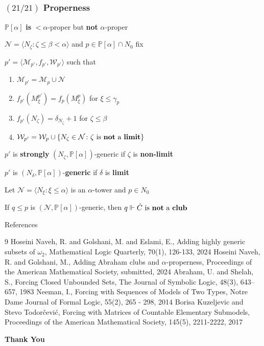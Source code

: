 \documentclass{beamer}
\newcommand{\p}{\mathds{P}}
\begin{document}
\begin{frame}
\frametitle{$(21/21)$ \hspace{20mm} Properness}
\begin{theorem}
$\p[\alpha]$ \textbf{is} $<\alpha$-proper but \textbf{not} $\alpha$-proper
\end{theorem}
\vspace{-2mm}
\pause
\begin{alertblock}{}
$\mathcal{N}=\langle N_{\zeta} \colon \zeta \leq \beta < \alpha \rangle$ and  $p \in \p[\alpha] \cap N_0$ fix

$p'= \langle \mathcal{M}_{p'}, f_{p'}, \mathcal{W}_{p'} \rangle$ such that
\begin{enumerate}
\item $\mathcal{M}_{p'}= \mathcal{M}_p \cup \mathcal{N}$
\item $f_{p'}(M^{p'}_{\xi})=f_p(M^p_{\xi})$ for $\xi \leq \gamma_p$
\item $f_{p'}(N_{\zeta})= \delta_{N_{\zeta}}+1$ for $\zeta \leq \beta$
\item $\mathcal{W}_{p'}= \mathcal{W}_p \cup \{N_{\zeta} \in \mathcal{N} \colon \zeta \text{ is \textbf{not} a \textbf{limit}} \}$
\end{enumerate}
\end{alertblock}
\vspace{-2mm}
\pause
\begin{block}{}
$p'$ is \textbf{strongly} $(N_{\zeta}, \p[\alpha])$-generic if $\zeta$ is \textbf{non-limit}

$p'$ is $(N_{\delta}, \p[\alpha])$-\textbf{generic} if $\delta$ is \textbf{limit}
\end{block}
\vspace{-2mm}
\pause
\begin{alertblock}{}
Let $\mathcal{N}=\langle N_{\xi} \colon \xi \leq \alpha \rangle$ is an $\alpha$-tower and $p \in N_0$

If $ q \leq p$ is $(\mathcal{N}, \p[\alpha])$-generic, then $q \Vdash \dot{C} \text{ is \textbf{not} a \textbf{club}}$
\end{alertblock}
\end{frame}
\begin{frame}{References}
\begin{thebibliography}{9}
Hoseini Naveh, R. and Golshani, M. and Eslami, E., Adding highly generic subsets of $\omega_2$, Mathematical Logic Quarterly, 70(1), 126-133, 2024
 Hoseini Naveh, R. and Golshani, M., Adding {A}braham clubs and  $\alpha$-properness, Proceedings of the American Mathematical Society, submitted, 2024
 Abraham, U. and Shelah, S., Forcing Closed Unbounded Sets, The Journal of Symbolic Logic, 48(3), 643--657, 1983
 Neeman, I., Forcing with Sequences of Models of Two Types, Notre Dame Journal of Formal Logic, 55(2), 265 - 298, 2014
 Borisa Kuzeljevic and Stevo Todorčević, Forcing with Matrices of Countable Elementary Submodels, Proceedings of the American Mathematical Society, 145(5), 2211-2222, 2017
\end{thebibliography}
\cite{AS}\cite{k1}\cite{k2}\cite{neeman}\cite{todorcevic3}
\end{frame}
\begin{frame}
\begin{center}
\textbf{{\Huge \textbf{Thank You}}}
\end{center}
\end{frame}
\end{document}
